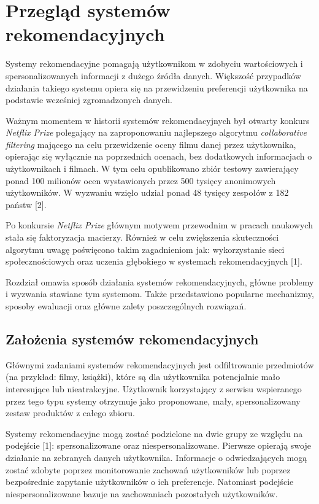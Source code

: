 
\chapter{Przegląd systemów rekomendacyjnych}

Systemy rekomendacyjne pomagają użytkownikom w zdobyciu wartościowych i spersonalizowanych informacji z dużego źródła danych. Większość przypadków działania takiego systemu opiera się na przewidzeniu preferencji użytkownika na podstawie wcześniej zgromadzonych danych.

Ważnym momentem w historii systemów rekomendacyjnych był otwarty konkurs \textit{Netflix Prize} polegający na zaproponowaniu najlepszego algorytmu \textit{collaborative filtering} mającego na celu przewidzenie oceny filmu danej przez użytkownika, opierając się wyłącznie na poprzednich ocenach, bez dodatkowych informacjach o użytkownikach i filmach. W tym celu opublikowano zbiór testowy zawierający ponad 100 milionów ocen wystawionych przez 500 tysięcy anonimowych użytkowników. W wyzwaniu wzięło udział ponad 48 tysięcy zespołów z 182 państw [2].

Po konkursie \textit{Netflix Prize} głównym motywem przewodnim w pracach naukowych stała się faktoryzacja macierzy. Również w celu zwiększenia skuteczności algorytmu uwagę poświęcono takim zagadnieniom jak: wykorzystanie sieci społecznościowych oraz uczenia głębokiego w systemach rekomendacyjnych [1].

Rozdział omawia sposób działania systemów rekomendacyjnych, główne problemy i wyzwania stawiane tym systemom. Także przedstawiono popularne mechanizmy, sposoby ewaluacji oraz główne zalety poszczególnych rozwiązań.

\section{Założenia systemów rekomendacyjnych}

Głównymi zadaniami systemów rekomendacyjnych jest odfiltrowanie przedmiotów (na przykład: filmy, książki), które są dla użytkownika potencjalnie mało interesujące lub nieatrakcyjne. Użytkownik korzystający z serwisu wspieranego przez tego typu systemy otrzymuje jako proponowane, mały, spersonalizowany zestaw produktów z całego zbioru.

Systemy rekomendacyjne mogą zostać podzielone na dwie grupy ze względu na podejście [1]: spersonalizowane oraz niespersonalizowane. Pierwsze opierają swoje działanie na zebranych danych użytkownika. Informacje o odwiedzających mogą zostać zdobyte poprzez monitorowanie zachowań użytkowników lub poprzez bezpośrednie zapytanie użytkowników o ich preferencje. Natomiast podejście niespersonalizowane bazuje na zachowaniach pozostałych użytkowników.

